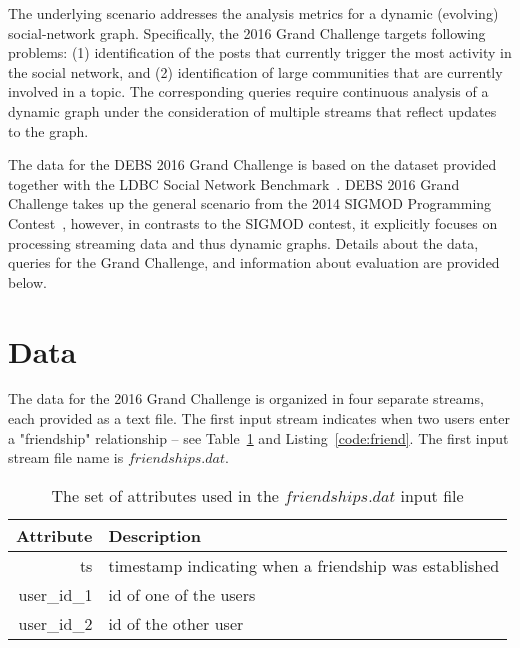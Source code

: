 \documentclass{sig-alternate}
\begin{document}
The underlying scenario addresses the analysis metrics for a dynamic (evolving) social-network graph. Specifically, the 2016 Grand Challenge targets following problems: (1) identification of the posts that currently trigger the most activity in the social network, and (2) identification of large communities that are currently involved in a topic. The corresponding queries require continuous analysis of a dynamic graph under the consideration of multiple streams that reflect updates to the graph.

The data for the DEBS 2016 Grand Challenge is based on the dataset provided together with the LDBC Social Network Benchmark~\cite{erling2015social}. DEBS 2016 Grand Challenge takes up the general scenario from the 2014 SIGMOD Programming Contest~\cite{DBLP:conf/sigmod/2014}, however, in contrasts to the SIGMOD contest, it explicitly focuses on processing streaming data and thus dynamic graphs. Details about the data, queries for the Grand Challenge, and information about evaluation are provided below.

\section{Data}
\label{sec:data}
The data for the 2016 Grand Challenge is organized in four separate streams, each provided as a text file. The first input stream indicates when two users enter a "friendship" relationship -- see Table~\ref{table:friend} and Listing~\ref{code:friend}. The first input stream file name is $friendships.dat$.


\begin{table}[ht]
	\caption{The set of attributes used in the $friendships.dat$ input file}
	\centering 
	\begin{tabular}{r p{5.2cm}}
		\toprule
		Attribute		&	 Description\\
		\midrule
		ts			&	timestamp indicating when a friendship was established\\[2ex]
		user\_id\_1	&	id of one of the users\\[2ex]
		user\_id\_2	&	id of the other user\\[2ex]		
		\bottomrule 
	\end{tabular}
	\label{table:friend}
\end{table}
\end{document}
